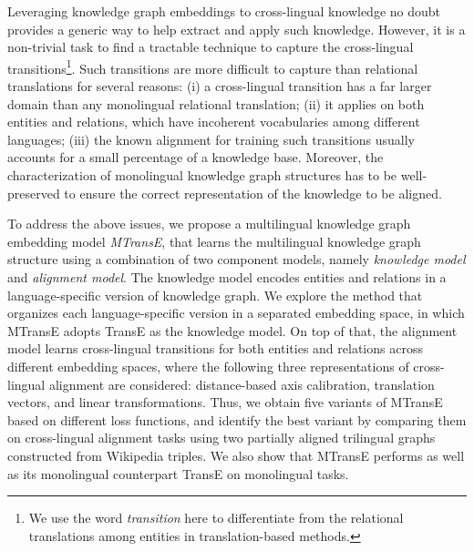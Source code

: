 \documentclass{article}
\begin{document}
Leveraging knowledge graph embeddings to cross-lingual knowledge no doubt provides a generic way to help \mbox{extract} and apply such knowledge. However, it is a non-trivial task to find a tractable technique to capture the cross-lingual transitions\footnote{We use the word \emph{transition} here to differentiate from the relational translations among entities in translation-based methods.}. Such transitions are more difficult to capture than relational translations for several reasons: (i) a cross-lingual transition has a far larger domain than any monolingual relational translation;
(ii) it applies on both entities and relations, which have incoherent vocabularies among different languages;
(iii) the known alignment for training such transitions usually accounts for a small percentage of a knowledge base.
Moreover, the characterization of monolingual knowledge graph structures has to be well-preserved to ensure the correct representation of the knowledge to be aligned.













To address the above issues, we propose
a multilingual knowledge graph embedding model {\em MTransE}, that
\mbox{learns} the multilingual knowledge graph structure using a combination of two component models, namely {\em knowledge model} and {\em alignment model}.
The knowledge model encodes entities and relations in a language-specific version of knowledge graph.
We explore the method that
organizes each language-specific version in a \mbox{separated} embedding space, in which
MTransE adopts TransE as the knowledge model. On top of that, the alignment model learns cross-lingual transitions for both entities and relations across different embedding spaces, where the following three representations of cross-lingual alignment are considered: distance-based axis calibration, translation vectors, and linear transformations. Thus, we obtain five variants of MTransE based on different loss functions, and identify the best variant by comparing them on cross-lingual \mbox{alignment} tasks using two partially aligned trilingual graphs constructed from Wikipedia triples. We also show that MTransE performs as well as its monolingual counterpart TransE on monolingual tasks.
\end{document}
